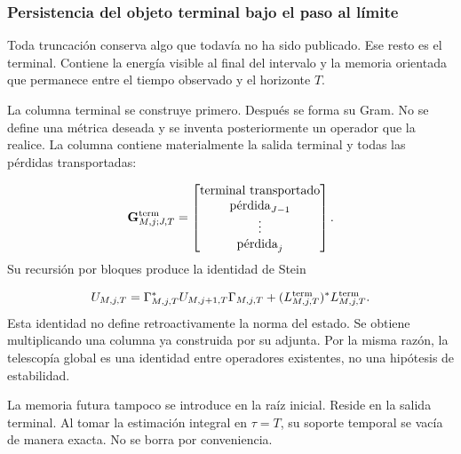 \subsubsection{Persistencia del objeto terminal bajo el paso al límite}
Toda truncación conserva algo que todavía no ha sido publicado. Ese resto es el terminal. Contiene la energía visible al final del intervalo y la memoria orientada que permanece entre el tiempo observado y el horizonte \(T\).\par
La columna terminal se construye primero. Después se forma su Gram. No se define una métrica deseada y se inventa posteriormente un operador que la realice. La columna contiene materialmente la salida terminal y todas las pérdidas transportadas:\par
\[
\mathbf G_{M,j;J,T}^{\rm term}
=
\begin{bmatrix}
\text{terminal transportado}\\
\text{pérdida}_{J-1}\\
\vdots\\
\text{pérdida}_{j}
\end{bmatrix}.
\]
Su recursión por bloques produce la identidad de Stein\par
\[
U_{M,j,T}
=
\Gamma_{M,j,T}^{*}
U_{M,j+1,T}
\Gamma_{M,j,T}
+
(L_{M,j,T}^{\rm term})^{*}
L_{M,j,T}^{\rm term}.
\]
Esta identidad no define retroactivamente la norma del estado. Se obtiene multiplicando una columna ya construida por su adjunta. Por la misma razón, la telescopía global es una identidad entre operadores existentes, no una hipótesis de estabilidad.\par
La memoria futura tampoco se introduce en la raíz inicial. Reside en la salida terminal. Al tomar la estimación integral en \(\tau=T\), su soporte temporal se vacía de manera exacta. No se borra por conveniencia.\par
{}
